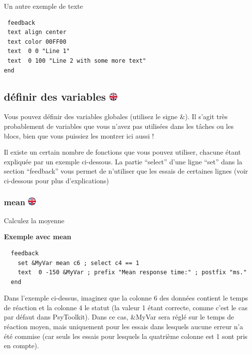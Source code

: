 \documentclass[
]{book}
\begin{document}
Un autre exemple de texte

\begin{verbatim}
 feedback
 text align center
 text color 00FF00
 text  0 0 "Line 1"
 text  0 100 "Line 2 with some more text"
end
\end{verbatim}

\hypertarget{duxe9finir-des-variables-ukflag}{%
\subsection[définir des variables ]{\texorpdfstring{définir des
variables
\href{https://www.psytoolkit.org/doc3.1.0/feedback.html\#_set}{\protect\includegraphics{img/ukflag.png}}}{définir des variables ukflag}}\label{duxe9finir-des-variables-ukflag}}

Vous pouvez définir des variables globales (utilisez le signe \&). Il
s'agit très probablement de variables que vous n'avez pas utilisées dans
les tâches ou les blocs, bien que vous puissiez les montrer ici aussi !

Il existe un certain nombre de fonctions que vous pouvez utiliser,
chacune étant expliquée par un exemple ci-dessous. La partie ``select''
d'une ligne ``set'' dans la section ``feedback'' vous permet de
n'utiliser que les essais de certaines lignes (voir ci-dessous pour plus
d'explications)

\hypertarget{mean-ukflag}{%
\subsubsection[mean ]{\texorpdfstring{mean
\href{https://www.psytoolkit.org/doc3.1.0/feedback.html\#_mean}{\protect\includegraphics{img/ukflag.png}}}{mean ukflag}}\label{mean-ukflag}}

Calculez la moyenne

\textbf{Exemple avec mean}

\begin{verbatim}
  feedback
    set &MyVar mean c6 ; select c4 == 1
    text  0 -150 &MyVar ; prefix "Mean response time:" ; postfix "ms."
  end
\end{verbatim}

Dans l'exemple ci-dessus, imaginez que la colonne 6 des données contient
le temps de réaction et la colonne 4 le statut (la valeur 1 étant
correcte, comme c'est le cas par défaut dans PsyToolkit). Dans ce cas,
\&MyVar sera réglé sur le temps de réaction moyen, mais uniquement pour
les essais dans lesquels aucune erreur n'a été commise (car seuls les
essais pour lesquels la quatrième colonne est 1 sont pris en compte).
\end{document}
